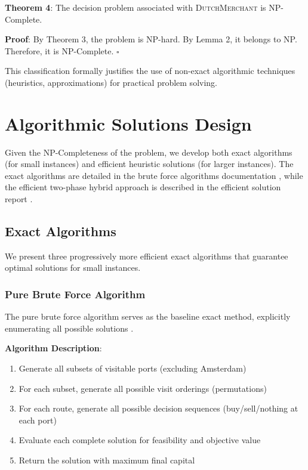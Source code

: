 \documentclass[12pt]{article}
\begin{document}
\textbf{Theorem 4}: The decision problem associated with \textsc{DutchMerchant} is NP-Complete.

\textbf{Proof}: By Theorem 3, the problem is NP-hard. By Lemma 2, it belongs to NP. Therefore, it is NP-Complete. \hfill $\square$

This classification formally justifies the use of non-exact algorithmic techniques (heuristics, approximations) for practical problem solving.

\section{Algorithmic Solutions Design}
\label{sec:algorithms}

Given the NP-Completeness of the problem, we develop both exact algorithms (for small instances) and efficient heuristic solutions (for larger instances). The exact algorithms are detailed in the brute force algorithms documentation \cite{brute_force_doc}, while the efficient two-phase hybrid approach is described in the efficient solution report \cite{efficient_doc}.

\subsection{Exact Algorithms}

We present three progressively more efficient exact algorithms that guarantee optimal solutions for small instances.

\subsubsection{Pure Brute Force Algorithm}

The pure brute force algorithm serves as the baseline exact method, explicitly enumerating all possible solutions \cite{cormen2009}.

\textbf{Algorithm Description}:
\begin{enumerate}
    \item Generate all subsets of visitable ports (excluding Amsterdam)
    \item For each subset, generate all possible visit orderings (permutations)
    \item For each route, generate all possible decision sequences (buy/sell/nothing at each port)
    \item Evaluate each complete solution for feasibility and objective value
    \item Return the solution with maximum final capital
\end{enumerate}
\end{document}
